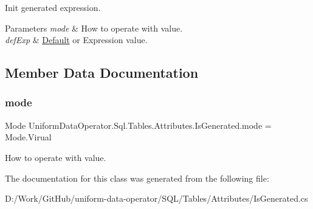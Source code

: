 Init generated expression. 


\begin{DoxyParams}{Parameters}
{\em mode} & How to operate with value.\\
\hline
{\em def\+Exp} & \mbox{\hyperlink{class_uniform_data_operator_1_1_sql_1_1_tables_1_1_attributes_1_1_default}{Default}} or Expression value.\\
\hline
\end{DoxyParams}


\subsection{Member Data Documentation}
\mbox{\label{class_uniform_data_operator_1_1_sql_1_1_tables_1_1_attributes_1_1_is_generated_af3fa1eea5f12c0a0f8128b794df15b78}} 
\subsubsection{\texorpdfstring{mode}{mode}}
{\footnotesize\ttfamily Mode Uniform\+Data\+Operator.\+Sql.\+Tables.\+Attributes.\+Is\+Generated.\+mode = Mode.\+Virual}



How to operate with value. 



The documentation for this class was generated from the following file\+:\begin{DoxyCompactItemize}
\item 
D\+:/\+Work/\+Git\+Hub/uniform-\/data-\/operator/\+S\+Q\+L/\+Tables/\+Attributes/Is\+Generated.\+cs\end{DoxyCompactItemize}
